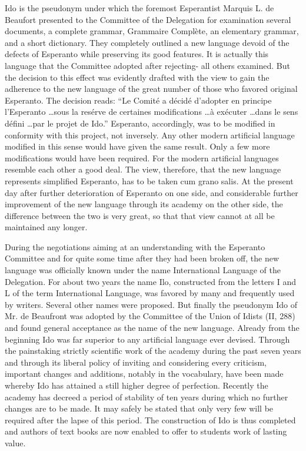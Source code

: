 Ido is the pseudonym under which the foremost Esperantist Marquis L. de Beaufort presented to the Committee of the Delegation for examination several documents, a complete grammar, Grammaire Complète, an elementary grammar, and a short dictionary. They completely outlined a new language devoid of the defects of Esperanto while preserving its good features. It is actually this language that the Committee adopted after rejecting- all others examined. But the decision to this effect was evidently drafted with the view to gain the adherence to the new language of the great number of those who favored original Esperanto. The decision reads: “Le Comité a décidé d’adopter en principe l’Esperanto \ldots sous la resérve de certaines modifications \ldots à exécuter \ldots dans le sens défini \ldots par le projet de Ido.” Esperanto, accordingly, was to be modified in conformity with this project, not inversely. Any other modern artificial language modified in this sense would have given the same result. Only a few more modifications would have been required. For the modern artificial languages resemble each other a good deal. The view, therefore, that the new language represents simplified Esperanto, has to be taken cum grano salis. At the present day after further deterioration of Esperanto on one side, and considerable further improvement of the new language through its academy on the other side, the difference between the two is very great, so that that view cannot at all be maintained any longer. 

During the negotiations aiming at an understanding with the Esperanto Committee and for quite some time after they had been broken off, the new language was officially known under the name International Language of the Delegation. For about two years the name Ilo, constructed from the letters I and L of the term International Language, was favored by many and frequently used by writers. Several other names were proposed. But finally the pseudonym Ido of Mr. de Beaufront was adopted by the Committee of the Union of Idists (II, 288) and found general acceptance as the name of the new language. 
Already from the beginning Ido was far superior to any artificial language ever devised. Through the painstaking strictly scientific work of the academy during the past seven years and through its liberal policy of inviting and considering every criticism, important changes and additions, notably in the vocabulary, have been made whereby Ido has attained a still higher degree of perfection. Recently the academy has decreed a period of stability of ten years during which no further changes are to be made. It may safely be stated that only very few will be required after the lapse of this period. The construction of Ido is thus completed and authors of text books are now enabled to offer to students work of lasting value.


